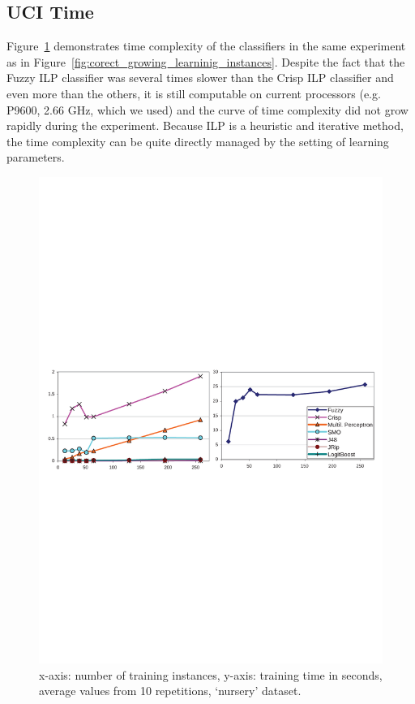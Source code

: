 \subsection{UCI Time}


Figure~\ref{fig:learning_speed} demonstrates time complexity of the classifiers in the same experiment as in Figure~\ref{fig:corect_growing_learninig_instances}. Despite the fact that the Fuzzy ILP classifier was several times slower than the Crisp ILP classifier and even more than the others, it is still computable on current processors (e.g. P9600, 2.66 GHz, which we used) and the curve of time complexity did not grow rapidly during the experiment. Because ILP is a heuristic and iterative method, the time complexity can be quite directly managed by the setting of learning parameters.

\begin{figure}
\centerline{\includegraphics[width=\hsize]{learning_speed}}
\caption{x-axis: number of training instances, y-axis: training time in seconds, average values from 10 repetitions, `nursery' dataset.}
\label{fig:learning_speed}
\end{figure}


